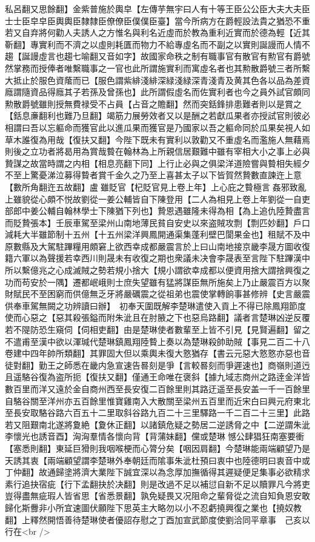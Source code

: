 私呂翻又思餘翻】金紫普施於輿皁【左傳芋無宇曰人有十等王臣公公臣大夫大夫臣士士臣皁皁臣輿輿臣隸隸臣僚僚臣僕僕臣臺】當今所病方在爵輕設法貴之猶恐不重若又自弃將何勸人夫誘人之方惟名與利名近虛而於教為重利近實而於德為輕【近其靳翻】專實利而不濟之以虛則耗匱而物力不給專虛名而不副之以實則誕謾而人情不趨【誕謾虛言也趨七喻翻又音如字】故國家命秩之制有職事官有散官有勲官有爵號然掌務而授俸者唯繫職事之一官也此所謂施實利而寓虛名者也其勲散爵號三者所繫大抵止於服色資䕃而已【服色謂紫緋淺緋深緑淺緑深青淺青及黄其色各以品為差資廕謂隨資品得廕其子若孫及曾孫也】此所謂假虛名而佐實利者也今之員外試官頗同勲散爵號雖則授無費禄受不占員【占音之贍翻】然而突銛鋒排患難者則以是賞之【銛息亷翻利也難乃旦翻】竭筋力展勞效者又以是酬之若獻瓜果者亦授試官則彼必相謂曰吾以忘軀命而獲官此以進瓜果而獲官是乃國家以吾之軀命同於瓜果矣視人如草木誰復為用哉【復扶又翻】今陛下既未有實利以敦勸又不重虛名而濫施人無藉焉則後之立功者將曷用為賞哉䞇在翰林為上所親信居艱難中雖有宰相大小之事上必與贄謀之故當時謂之内相【相息亮翻下同】上行止必與之俱梁洋道險嘗與䞇相失經夕不至上驚憂涕泣募得䞇者賞千金久之乃至上喜甚太子以下皆賀然贄數直諫迕上意【數所角翻迕五故翻】盧雖貶官【杞貶官見上卷上年】上心庇之䞇極言姦邪致亂上雖貌從心頗不悦故劉從一姜公輔皆自下陳登用【二人為相見上卷上年劉從一自吏部郎中姜公輔自翰林學士下陳猶下列也】贄恩遇雖隆未得為相【為上追仇陸贄盡言而貶贄張本】壬辰車駕至梁州山南地薄民貧自安史以來盗賊攻剽【剽匹妙翻】戶口減耗大半雖節制十五州【十五州梁洋興鳳開通渠集蓬利壁巴閬果金也】租賦不及中原數縣及大駕駐蹕糧用頗窘上欲西幸成都嚴震言於上曰山南地接京畿李晟方圖收復籍六軍以為聲援若幸西川則晟未有收復之期也衆議未决會李晟表至言陛下駐蹕漢中所以繫億兆之心成滅賊之勢若規小捨大【規小謂欲幸成都以便資用捨大謂捨興復之功而苟安於一隅】遷都岷峨則士庶失望雖有猛將謀臣無所施矣上乃止嚴震百方以聚財賦民不至困窮而供億無乏牙將嚴礪震之從祖弟也震使掌轉餉事甚修辨【史言嚴震供奉車駕無闕之功辨讀曰辦】　初奉天圍既解李楚琳遣使入貢上不得已除鳳翔節度使而心惡之【惡其殺張鎰而附朱泚且在肘腋之下也惡烏路翻】議者言楚琳凶逆反覆若不隄防恐生窺伺【伺相吏翻】由是楚琳使者數輩至上皆不引見【見賢遍翻】留之不遣甫至漢中欲以渾瑊代楚琳鎮鳳翔陸䞇上奏以為楚琳殺帥助賊【事見二百二十八卷建中四年帥所類翻】其罪固大但以乘輿未復大憝猶存【書云元惡大憝憝亦惡也音徒對翻】勤王之師悉在畿内急宣速告晷刻是爭【言較晷刻而爭遲速也】商嶺則道迃且遥駱谷復為盗所扼【復扶又翻】僅通王命唯在褒斜【據九域志商州之路逹金洋皆數百里而洋又遠於金自商州西至長安復二百餘里則其路迂遥至長安盖一千一百餘里自駱谷關至洋州亦五百餘里惟寶雞南入大散關至梁州五百里而近宋白曰興元府東北至長安取駱谷路六百五十二里取斜谷路九百二十三里驛路一千二百二十三里】此路若又阻艱南北遂將夐絶【夐休正翻】以諸鎮危疑之勢居二逆誘脅之中【二逆謂朱泚李懷光也誘音酉】洶洶羣情各懷向背【背蒲妹翻】儻或楚琳憾公肆猖狂南塞要衝【塞悉則翻】東延巨猾則我咽喉梗而心膂分矣【咽因肩翻】今楚琳能兩端顧望乃是天誘其衷【兩端顧望謂李楚琳外奉朝廷而隂事朱泚杜預曰衷中也陸德明曰衷音中或丁仲翻】故通歸塗將濟大業陛下誠宜深以為念厚加撫循得其遲疑便足集事必欲精求素行追抉宿疵【行下孟翻抉於决翻】則是改過不足以補愆自新不足以贖罪凡今將吏豈得盡無疵瑕人皆省思【省悉景翻】孰免疑畏又况阻命之輩脅從之流自知負恩安敢歸化斯釁非小所宜速圖伏願陛下思英主大略勿以小不忍虧撓興復之業也【撓奴教翻】上釋然開悟善待楚琳使者優詔存慰之丁酉加宣武節度使劉洽同平章事　己亥以行在<br />
